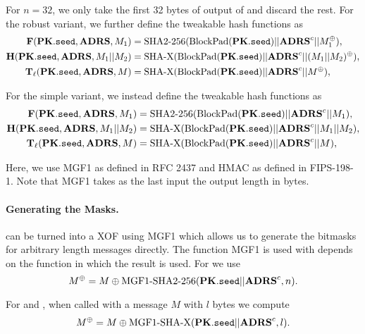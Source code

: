    For $n=32$, we only take the first 32 bytes of output of \sphincsPRF and discard the rest. For the robust variant, we further define the tweakable hash functions as
   \begin{equation}
   \begin{aligned}
      \mathbf{F}(\mathbf{PK}.\texttt{seed}, \textbf{ADRS}, M_1) &= \text{SHA2-256}(\text{BlockPad}(\mathbf{PK}.\texttt{seed}) || \textbf{ADRS}^{c} || M_1^{\oplus}),\\
      \mathbf{H}(\mathbf{PK}.\texttt{seed}, \textbf{ADRS}, M_1 || M_2) &= \text{SHA-X}(\text{BlockPad}(\mathbf{PK}.\texttt{seed}) || \textbf{ADRS}^{c} || (M_1|| M_2)^{\oplus}),\\
      \mathbf{T}_\ell(\mathbf{PK}.\texttt{seed}, \textbf{ADRS}, M) &= \text{SHA-X}(\text{BlockPad}(\mathbf{PK}.\texttt{seed}) || \textbf{ADRS}^{c} || M^{\oplus}),\\
   \end{aligned}
   \end{equation}

   For the simple variant, we instead define the tweakable hash functions as
   \begin{equation}
   \begin{aligned}
      \mathbf{F}(\mathbf{PK}.\texttt{seed}, \textbf{ADRS}, M_1) &= \text{SHA2-256}(\text{BlockPad}(\mathbf{PK}.\texttt{seed}) || \textbf{ADRS}^{c} || M_1),\\
      \mathbf{H}(\mathbf{PK}.\texttt{seed}, \textbf{ADRS}, M_1 || M_2) &= \text{SHA-X}(\text{BlockPad}(\mathbf{PK}.\texttt{seed}) || \textbf{ADRS}^{c} || M_1 || M_2),\\
      \mathbf{T}_\ell(\mathbf{PK}.\texttt{seed}, \textbf{ADRS}, M) &= \text{SHA-X}(\text{BlockPad}(\mathbf{PK}.\texttt{seed}) || \textbf{ADRS}^{c} || M),\\
   \end{aligned}
   \end{equation}

   Here, we use MGF1 as defined in RFC 2437 and HMAC as defined in FIPS-198-1.
   Note that MGF1 takes as the last input the output length in bytes.
   \paragraph{Generating the Masks.} \shatwo can be turned into a XOF using MGF1
   which allows us to generate the bitmasks for arbitrary length messages directly. The function MGF1 is used with depends on the function in which the result is used. For \sphincsF we use
   \begin{equation*}
      M^{\oplus} = M \oplus \text{MGF1-}\text{SHA2-256}(\mathbf{PK}.\texttt{seed} || \textbf{ADRS}^{c}, n).
   \end{equation*}

   For \sphincsH and \sphincsT, when called with a message $M$ with $l$ bytes we compute
   \begin{equation*}
      M^{\oplus} = M \oplus \text{MGF1-}\text{SHA-X}(\mathbf{PK}.\texttt{seed} || \textbf{ADRS}^{c}, l).
   \end{equation*}

